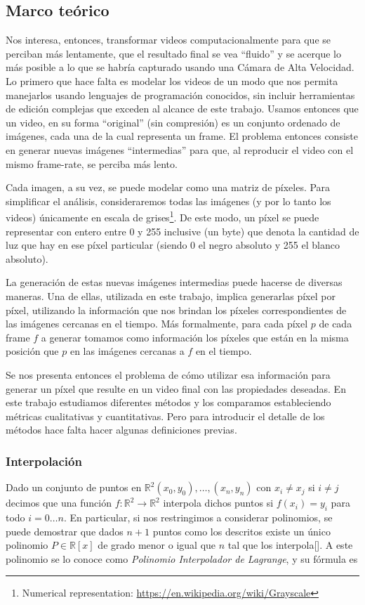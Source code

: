 \subsection{Marco teórico}
Nos interesa, entonces, transformar videos computacionalmente para que se perciban más lentamente, que el resultado final se vea ``fluido'' y se acerque lo más posible a lo que se habría capturado usando una Cámara de Alta Velocidad. Lo primero que hace falta es modelar los videos de un modo que nos permita manejarlos usando lenguajes de programación conocidos, sin incluir herramientas de edición complejas que exceden al alcance de este trabajo. Usamos entonces que un video, en su forma ``original'' (sin compresión) es un conjunto ordenado de imágenes, cada una de la cual representa un frame. El problema entonces consiste en generar nuevas imágenes ``intermedias'' para que, al reproducir el video con el mismo frame-rate, se perciba más lento.

Cada imagen, a su vez, se puede modelar como una matriz de píxeles. Para simplificar el análisis, consideraremos todas las imágenes (y por lo tanto los videos) únicamente en escala de grises\footnote{Numerical representation: \url{https://en.wikipedia.org/wiki/Grayscale}}. De este modo, un píxel se puede representar con entero entre 0 y 255 inclusive (un byte) que denota la cantidad de luz que hay en ese píxel particular (siendo 0 el negro absoluto y 255 el blanco absoluto).

La generación de estas nuevas imágenes intermedias puede hacerse de diversas maneras. Una de ellas, utilizada en este trabajo, implica generarlas píxel por píxel, utilizando la información que nos brindan los píxeles correspondientes de las imágenes cercanas en el tiempo. Más formalmente, para cada píxel $p$ de cada frame $f$ a generar tomamos como información los píxeles que están en la misma posición que $p$ en las imágenes cercanas a $f$ en el tiempo.

Se nos presenta entonces el problema de cómo utilizar esa información para generar un píxel que resulte en un video final con las propiedades deseadas. En este trabajo estudiamos diferentes métodos y los comparamos estableciendo métricas cualitativas y cuantitativas. Pero para introducir el detalle de los métodos hace falta hacer algunas definiciones previas.

\subsubsection{Interpolación}
Dado un conjunto de puntos en $\mathbb{R}^2 (x_0, y_0), \ldots, (x_n, y_n)$ con $x_i \neq x_j$ si $i \neq j$ decimos que una función $f:\mathbb{R}^2 \rightarrow \mathbb{R}^2$ interpola dichos puntos si $f(x_i) = y_i$ para todo $i = 0 \ldots n$. En particular, si nos restringimos a considerar polinomios, se puede demostrar que dados $n + 1$ puntos como los descritos existe un único polinomio $P \in \mathbb{R}[x]$ de grado menor o igual que $n$ tal que los interpola[\cite{wiki_lagrange_polynomial}]. A este polinomio se lo conoce como \emph{Polinomio Interpolador de Lagrange}, y su fórmula es 

